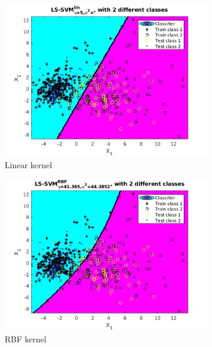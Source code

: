 \documentclass{article}
\begin{document}
\begin{figure}[]
        \begin{subfigure}{0.45\linewidth}
            \includegraphics[width=\linewidth]{breast_linear}
            \caption{Linear kernel}
        \end{subfigure}
        \begin{subfigure}{0.45\linewidth}
            \includegraphics[width=\linewidth]{breast_rbf}
            \caption{RBF kernel}
        \end{subfigure}
        \centering
	   \begin{subfigure}{0.45\linewidth}

\end{subfigure}
\end{figure}
\end{document}
